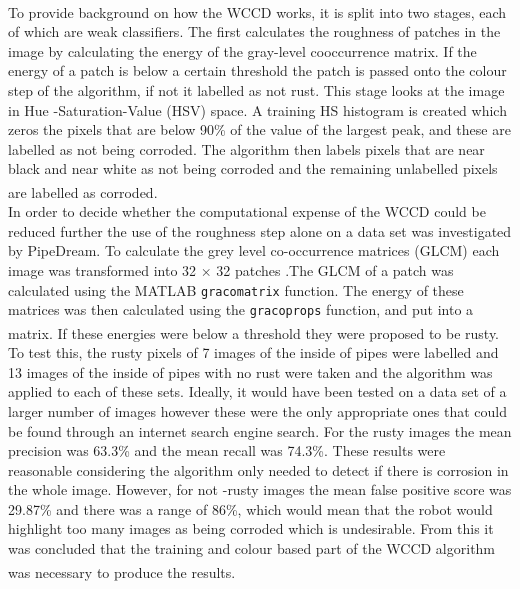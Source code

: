 \documentclass[11pt]{article}		%
\newcommand{\supercite}[1]{\textsuperscript{\cite{#1}}}		%
\begin{document}
        \\
        \hspace*{3ex}To provide background on how the WCCD works, it is split into two stages, each of which are weak classifiers. The first calculates the roughness of patches in the image by calculating the energy of the gray-level cooccurrence matrix. If the energy of a patch is below a certain threshold the patch is passed onto the colour step of the algorithm, if not it labelled as not rust. This stage looks at the image in Hue -Saturation-Value (HSV) space. A training HS histogram is created which zeros the pixels that are below 90\% of the value of the largest peak, and these are labelled as not being corroded. The algorithm then labels pixels that are near black and near white as not being corroded and the remaining unlabelled pixels are labelled as corroded\supercite{WCCD}.
        \\
        \hspace*{3ex}In order to decide whether the computational expense of the WCCD could be reduced further the use of the roughness step alone on a data set was investigated by PipeDream. To calculate the grey level co-occurrence matrices (GLCM) each image was transformed into 32 $\times$ 32 patches .The GLCM of a patch was calculated using the MATLAB \verb|gracomatrix| function. The energy of these matrices was then calculated using the \verb|gracoprops| function, and put into a matrix. If these energies were below a threshold\supercite{WCCD} they were proposed to be rusty. To test this, the rusty pixels of 7 images of the inside of pipes were labelled and 13 images of the inside of pipes with no rust were taken and the algorithm was applied to each of these sets. Ideally, it would have been tested on a data set of a larger number of images however these were the only appropriate ones that could be found through an internet search engine search. For the rusty images the mean precision was 63.3\% and the mean recall was 74.3\%. These results were reasonable considering the algorithm only needed to detect if there is corrosion in the whole image. However, for not -rusty images the mean false positive score was 29.87\% and there was a range of 86\%, which would mean that the robot would highlight too many images as being corroded which is undesirable. From this it was concluded that the training and colour based part of the WCCD algorithm was necessary to produce the results.\supercite{WCCD} 
\end{document}
